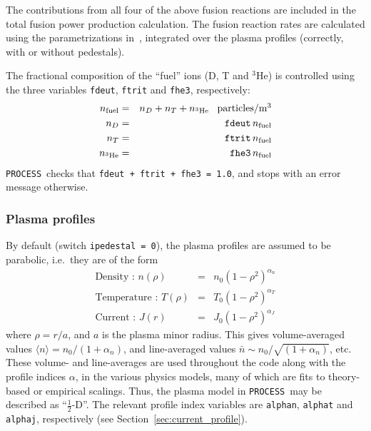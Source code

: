 \documentclass[11pt,a4paper]{report}
\newcommand{\process}{\mbox{\texttt{PROCESS}}}
\begin{document}
The contributions from all four of the above fusion reactions are included in
the total fusion power production calculation. The fusion reaction rates are
calculated using the parametrizations in~\cite{BoschHale}, integrated over the
plasma profiles (correctly, with or without pedestals).

The fractional composition of the ``fuel'' ions (D, T and $^3$He) is
controlled using the three variables \texttt{fdeut}, \texttt{ftrit} and
\texttt{fhe3}, respectively:
\begin{eqnarray*}
n_{\mbox{\scriptsize fuel}} & = & n_D + n_T + n_{\mathrm{^{3}He}}  \;\;\; \mbox{particles/m$^3$} \\
n_D & = & \mathtt{fdeut} \, n_{\mbox{\scriptsize fuel}} \\
n_T & = & \mathtt{ftrit} \, n_{\mbox{\scriptsize fuel}} \\
n_{\mathrm{^{3}He}} & = & \mathtt{fhe3} \, n_{\mbox{\scriptsize fuel}}
\end{eqnarray*}
\process\ checks that \texttt{fdeut + ftrit + fhe3 = 1.0}, and stops with an
error message otherwise.

\subsubsection{Plasma profiles}

By default (switch \texttt{ipedestal = 0}), the plasma profiles are assumed to
be parabolic, i.e.\ they are of the form
\begin{eqnarray}
\mbox{Density : } n(\rho) & = & n_0 \left( 1 - \rho^2 \right)^{\alpha_n} \\
\mbox{Temperature : } T(\rho) & = & T_0 \left( 1 - \rho^2 \right)^{\alpha_T} \\
\mbox{Current : } J(r) & = & J_0 \left( 1 - \rho^2 \right)^{\alpha_J}
\end{eqnarray}
where $\rho = r/a$, and $a$ is the plasma minor radius. This gives
volume-averaged values $\langle n \rangle = n_0 / (1+\alpha_n)$, and
line-averaged values $\bar{n} \sim n_0 / \sqrt{(1+\alpha_n)}$, etc.  These
volume- and line-averages are used throughout the code along with the profile
indices $\alpha$, in the various physics models, many of which are fits to
theory-based or empirical scalings. Thus, the plasma model in \process\ may
be described as ``$\frac{1}{2}$-D''.  The relevant profile index variables are
\texttt{alphan}, \texttt{alphat} and \texttt{alphaj}, respectively (see
Section~\ref{sec:current_profile}).
\end{document}
